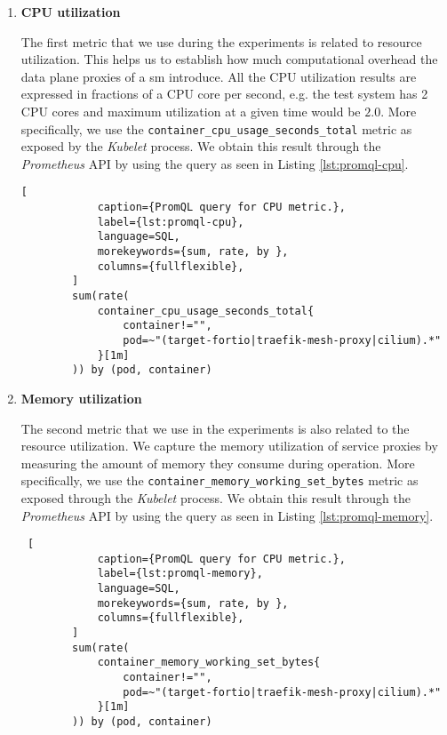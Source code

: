 \begin{enumerate}[label=\textbf{M\arabic*}, leftmargin=3\parindent]
    \item \textbf{CPU utilization}
    \label{exp:metric:1}
    
    The first metric that we use during the experiments is related to resource utilization. This helps us to establish how much computational overhead the data plane proxies of a \gls{sm} introduce. All the CPU utilization results are expressed in fractions of a CPU core per second, e.g. the test system has 2 CPU cores and maximum utilization at a given time would be $2.0$. More specifically, we use the \verb+container_cpu_usage_seconds_total+ metric as exposed by the \textit{Kubelet} process. We obtain this result through the \textit{Prometheus} API by using the query as seen in Listing \ref{lst:promql-cpu}.
    
    \begin{minipage}{\linewidth}
        \begin{lstlisting}[
            caption={PromQL query for CPU metric.},
            label={lst:promql-cpu},
            language=SQL,
            morekeywords={sum, rate, by },
            columns={fullflexible},
        ] 
        sum(rate(
            container_cpu_usage_seconds_total{
                container!="",
                pod=~"(target-fortio|traefik-mesh-proxy|cilium).*"
            }[1m]
        )) by (pod, container)
        \end{lstlisting}
    \end{minipage}

    \item \textbf{Memory utilization}
    \label{exp:metric:2}
    
    The second metric that we use in the experiments is also related to the resource utilization. We capture the memory utilization of service proxies by measuring the amount of memory they consume during operation. More specifically, we use the \verb+container_memory_working_set_bytes+ metric as exposed through the \textit{Kubelet} process. We obtain this result through the \textit{Prometheus} API by using the query as seen in Listing \ref{lst:promql-memory}.
    
    \begin{minipage}{\linewidth}
        \begin{lstlisting} [
            caption={PromQL query for CPU metric.},
            label={lst:promql-memory},
            language=SQL,
            morekeywords={sum, rate, by },
            columns={fullflexible},
        ] 
        sum(rate(
            container_memory_working_set_bytes{
                container!="",
                pod=~"(target-fortio|traefik-mesh-proxy|cilium).*"
            }[1m]
        )) by (pod, container)
        \end{lstlisting}
    \end{minipage}


\end{enumerate}
